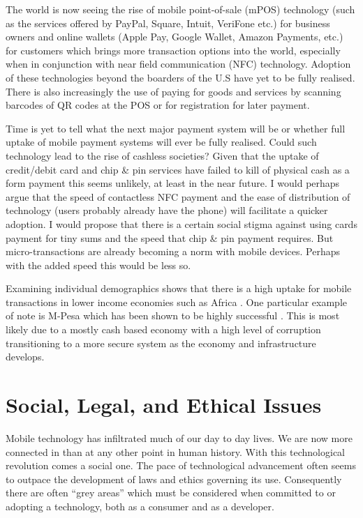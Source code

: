 \documentclass[paper=a4, fontsize=12pt]{scrartcl}	%
\numberwithin{equation}{section}															%
\numberwithin{figure}{section}																%
\numberwithin{table}{section}
\begin{document}
The world is now seeing the rise of mobile point-of-sale (mPOS) technology (such as the services offered by PayPal, Square, Intuit, VeriFone etc.) for business owners and online wallets (Apple Pay, Google Wallet, Amazon Payments, etc.) for customers which brings more transaction options into the world, especially when in conjunction with near field communication (NFC) technology. Adoption of these technologies beyond the boarders of the U.S have yet to be fully realised. There is also increasingly the use of paying for goods and services by scanning barcodes of QR codes at the POS or for registration for later payment. 

Time is yet to tell what the next major payment system will be or whether full uptake of mobile payment systems will ever be fully realised. Could such technology lead to the rise of cashless societies? Given that the uptake of credit/debit card and chip \& pin services have failed to kill of physical cash as a form payment this seems unlikely, at least in the near future. I would perhaps argue that the speed of contactless NFC payment and the ease of distribution of technology (users probably already have the phone) will facilitate a quicker adoption. I would propose that there is a certain social stigma against using cards payment for tiny sums and the speed that chip \& pin payment requires. But micro-transactions are already becoming a norm with mobile devices. Perhaps with the added speed this would be less so.

Examining individual demographics shows that there is a high uptake for mobile transactions in lower income economies such as Africa \cite{}. One particular example of note is M-Pesa \cite{} which has been shown to be highly successful \cite{}. This is most likely due to a mostly cash based economy with a high level of corruption transitioning to a more secure system as the economy and infrastructure develops.

\section{Social, Legal, and Ethical Issues}

Mobile technology has infiltrated much of our day to day lives. We are now more connected in than at any other point in human history. With this technological revolution comes a social one. The pace of technological advancement often seems to outpace the development of laws and ethics governing its use. Consequently there are often ``grey areas'' which must be considered when committed to or adopting a technology, both as a consumer and as a developer.
\end{document}
